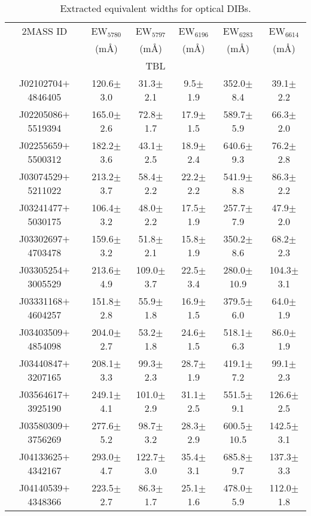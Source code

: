 \documentclass[printer]{aa} %
\begin{document}
\begin{table*}
\caption{Extracted equivalent widths for optical DIBs.}             
\label{tabtblohp}
\centering                                 
\small
\begin{tabular}{c c c c c c}      
\hline\hline                               
2MASS  ID &  EW$_{5780}$ & EW$_{5797}$  & EW$_{6196}$ & EW$_{6283}$  & EW$_{6614}$  \\
 &  (m\AA) & (m\AA) &(m\AA) &(m\AA) &(m\AA)\\
\hline
\multicolumn{6}{c}{TBL}\\
\hline                   
 J02102704$+$4846405  & 120.6$\pm$3.0 & 31.3$\pm$2.1 & 9.5$\pm$1.9 & 352.0$\pm$8.4 & 39.1$\pm$2.2\\ 
 J02205086$+$5519394  & 165.0$\pm$2.6 & 72.8$\pm$1.7 & 17.9$\pm$1.5 & 589.7$\pm$5.9 & 66.3$\pm$2.0\\ 
 J02255659$+$5500312  & 182.2$\pm$3.6 & 43.1$\pm$2.5 & 18.9$\pm$2.4 & 640.6$\pm$9.3 & 76.2$\pm$2.8\\ 
 J03074529$+$5211022  & 213.2$\pm$3.7 & 58.4$\pm$2.2 & 22.2$\pm$2.2 & 541.9$\pm$8.8 & 86.3$\pm$2.2\\ 
 J03241477$+$5030175  & 106.4$\pm$3.2 & 48.0$\pm$2.2 & 17.5$\pm$1.9 & 257.7$\pm$7.9 & 47.9$\pm$2.0\\ 
 J03302697$+$4703478  & 159.6$\pm$3.2 & 51.8$\pm$2.1 & 15.8$\pm$1.9 & 350.2$\pm$8.6 & 68.2$\pm$2.3\\ 
 J03305254$+$3005529  & 213.6$\pm$4.9 & 109.0$\pm$3.7 & 22.5$\pm$3.4 & 280.0$\pm$10.9 & 104.3$\pm$3.1\\ 
 J03331168$+$4604257  & 151.8$\pm$2.8 & 55.9$\pm$1.8 & 16.9$\pm$1.5 & 379.5$\pm$6.0 & 64.0$\pm$1.9\\ 
 J03403509$+$4854098  & 204.0$\pm$2.7 & 53.2$\pm$1.8 & 24.6$\pm$1.5 & 518.1$\pm$6.3 & 86.0$\pm$1.9\\ 
 J03440847$+$3207165  & 208.1$\pm$3.3 & 99.3$\pm$2.3 & 28.7$\pm$1.9 & 419.1$\pm$7.2 & 99.1$\pm$2.3\\ 
 J03564617$+$3925190  & 249.1$\pm$4.1 & 101.0$\pm$2.9 & 31.1$\pm$2.5 & 551.5$\pm$9.1 & 126.6$\pm$2.5\\ 
 J03580309$+$3756269  & 277.6$\pm$5.2 & 98.7$\pm$3.2 & 28.3$\pm$2.9 & 600.5$\pm$10.5 & 142.5$\pm$3.1\\ 
 J04133625$+$4342167  & 293.0$\pm$4.7 & 122.7$\pm$3.0 & 35.4$\pm$3.1 & 685.8$\pm$9.7 & 137.3$\pm$3.3\\ 
 J04140539$+$4348366  & 223.5$\pm$2.7 & 86.3$\pm$1.7 & 25.1$\pm$1.6 & 478.0$\pm$5.9 & 112.0$\pm$1.8\\ 

\end{tabular}
\end{table*}
\end{document}
